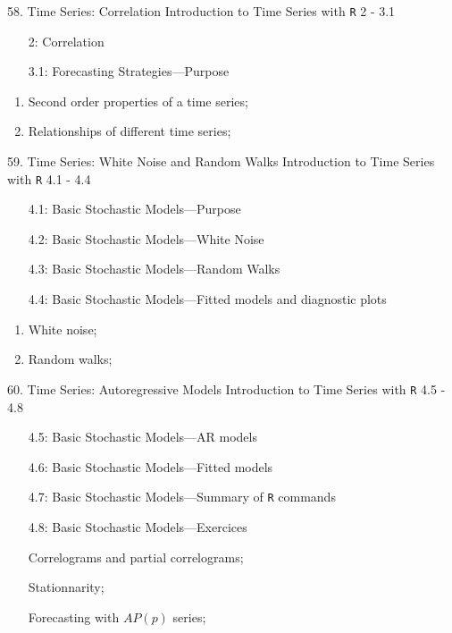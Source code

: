 \begin{CHPT_SUMM_AUTO}[label = {L.-58}]{58. Time Series: Correlation}
Introduction to Time Series with \texttt{R} 2 - 3.1
\begin{itemize}
	\item[2:]	Correlation
	\item[3.1:]	Forecasting Strategies---Purpose
\end{itemize}
\tcbline
	\begin{enumerate}
		\item	Second order properties of a time series;
		\item	Relationships of different time series;
	\end{enumerate}
\end{CHPT_SUMM_AUTO}

\begin{CHPT_SUMM_AUTO}[label = {L.-59}]{59. Time Series: White Noise and Random Walks}
Introduction to Time Series with \texttt{R} 4.1 - 4.4
\begin{itemize}
	\item[4.1:]	Basic Stochastic Models---Purpose
	\item[4.2:]	Basic Stochastic Models---White Noise
	\item[4.3:]	Basic Stochastic Models---Random Walks
	\item[4.4:]	Basic Stochastic Models---Fitted models and diagnostic plots
\end{itemize}
\tcbline
	\begin{enumerate}
		\item	White noise;
		\item	Random walks;
	\end{enumerate}
\end{CHPT_SUMM_AUTO}

\begin{CHPT_SUMM_AUTO}[label = {L.-60}]{60. Time Series: Autoregressive Models}
Introduction to Time Series with \texttt{R} 4.5 - 4.8
\begin{itemize}
	\item[4.5:]	Basic Stochastic Models---AR models
	\item[4.6:]	Basic Stochastic Models---Fitted models
	\item[4.7:]	Basic Stochastic Models---Summary of \texttt{R} commands
	\item[4.8:]	Basic Stochastic Models---Exercices
\end{itemize}
\tcbline
	\begin{enumerate}
		\item[]	Correlograms and partial correlograms;
		\item[]	Stationnarity;
		\item[]	Forecasting with $AP(p)$ series;
	\end{enumerate}
\end{CHPT_SUMM_AUTO}

